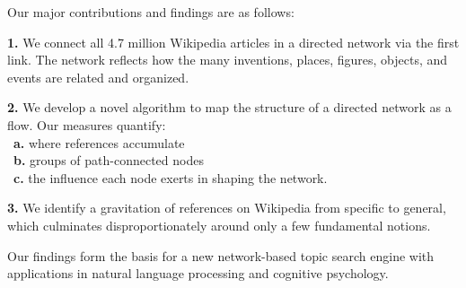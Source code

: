 \documentclass[11pt]{article}
\begin{document}
\sffamily 



\bigskip
\bigskip


Our major contributions and findings are as follows:

\textbf{1.}
We connect all 4.7 million Wikipedia articles in a directed network via the first link.
The network reflects how the many inventions, places, figures, objects, and events are related and organized.

\textbf{2.}
We develop a novel algorithm to map the structure of a directed network as a flow. Our measures quantify: \\
\mbox{}\ \textbf{a.}
where references accumulate\\
\mbox{}\ \textbf{b.}
groups of path-connected nodes\\
\mbox{}\ \textbf{c.}
the influence each node exerts in shaping the network.

\textbf{3.}
We identify a gravitation of references on Wikipedia from  specific to general, which culminates disproportionately around only a few fundamental notions. 


Our findings form the basis for a new network-based topic search engine with applications in natural language processing and cognitive psychology.




\end{document}
